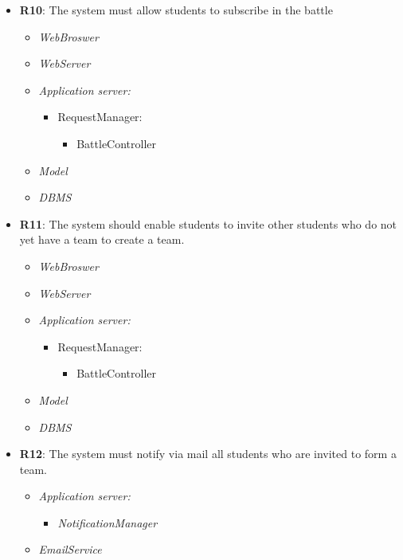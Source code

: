 \begin{itemize}
        \item \textbf{R10}: The system must allow students to subscribe in the battle
            \begin{itemize}
              \item \textit{WebBroswer}
                \item \textit{WebServer}
                \item \textit{Application server:}\begin{itemize}
                    \item RequestManager:\begin{itemize}
                        \item BattleController
                    \end{itemize}
                \end{itemize}
                \item \textit{Model}
                \item \textit{DBMS}
                \end{itemize}
            
            
        \item \textbf{R11}: The system should enable students to invite other students who do not yet have a team to create a team.
            \begin{itemize}
                \item \textit{WebBroswer}
                \item \textit{WebServer}
                \item \textit{Application server:}\begin{itemize}
                    \item RequestManager:\begin{itemize}
                        \item BattleController
                    \end{itemize}
                \end{itemize}
                \item \textit{Model}
                \item \textit{DBMS}
                \end{itemize}
        
        \item \textbf{R12}: The system must notify via mail all students who are invited to form a team.
            \begin{itemize}
                 \item \textit{Application server:}\begin{itemize}
                     \item \textit{NotificationManager}
                 \end{itemize}
                \item \textit{EmailService}
                \end{itemize}
            

\end{itemize}
